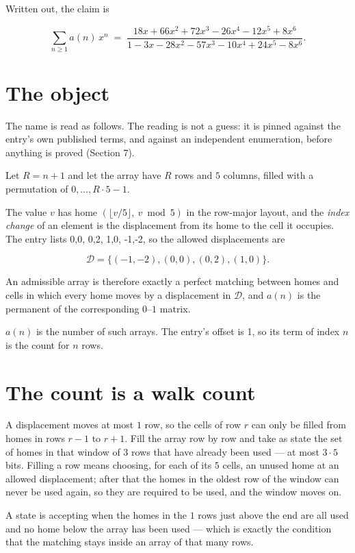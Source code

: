 \documentclass[11pt]{article}
\theoremstyle{definition}
\begin{document}
Written out, the claim is

\[\sum_{n \ge 1} a(n)\,x^n \;=\; \frac{18x + 66x^{2} + 72x^{3} - 26x^{4} - 12x^{5} + 8x^{6}}{1 - 3x - 28x^{2} - 57x^{3} - 10x^{4} + 24x^{5} - 8x^{6}}.\]

\section{The object}

The name is read as follows. The reading is not a guess: it is pinned against the entry's own published terms, and against an independent enumeration, before anything is proved (Section 7).

Let $R = n + 1$ and let the array have $R$ rows and $5$ columns, filled with a permutation of $0,\dots,R\cdot5-1$.

The value $v$ has home $(\lfloor v/5\rfloor,\ v \bmod 5)$ in the row-major layout, and the {\itshape index change} of an element is the displacement from its home to the cell it occupies. The entry lists 0,0, 0,2, 1,0, -1,-2, so the allowed displacements are

\[\mathcal{D} = \{(-1,-2), (0,0), (0,2), (1,0)\}.\]

An admissible array is therefore exactly a perfect matching between homes and cells in which every home moves by a displacement in $\mathcal{D}$, and $a(n)$ is the permanent of the corresponding $0$--$1$ matrix.

$a(n)$ is the number of such arrays. The entry's offset is 1, so its term of index $n$ is the count for $n$ rows.

\section{The count is a walk count}

A displacement moves at most $1$ row, so the cells of row $r$ can only be filled from homes in rows $r-1$ to $r+1$. Fill the array row by row and take as state the set of homes in that window of $3$ rows that have already been used --- at most $3\cdot5$ bits. Filling a row means choosing, for each of its $5$ cells, an unused home at an allowed displacement; after that the homes in the oldest row of the window can never be used again, so they are required to be used, and the window moves on.

A state is accepting when the homes in the $1$ rows just above the end are all used and no home below the array has been used --- which is exactly the condition that the matching stays inside an array of that many rows.
\end{document}
